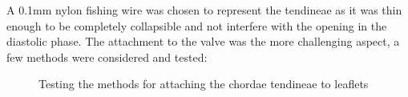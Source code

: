 A 0.1mm nylon fishing wire was chosen to represent the tendineae as it was thin enough to be completely collapsible and not interfere with the opening in the diastolic phase.
The attachment to the valve was the more challenging aspect, a few methods were considered and tested:
\begin{figure}[H]
    \centering
    \quad
    \caption{Testing the methods for attaching the chordae tendineae to leaflets}
    \label{fig:ctattachment}
\end{figure}
